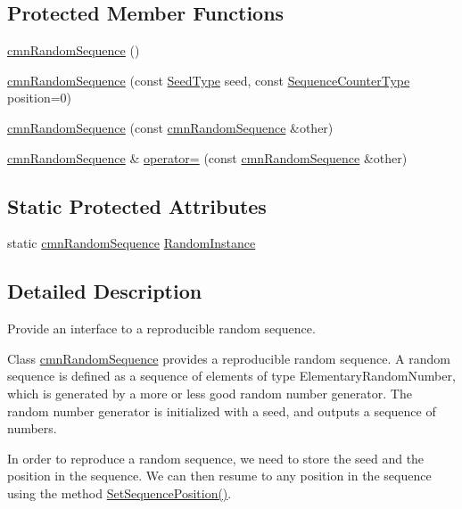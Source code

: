 \subsection*{Protected Member Functions}
\begin{DoxyCompactItemize}
\item 
\hyperlink{classcmn_random_sequence_ac2e1ccceb37bb3e42d1fc3148a564a30}{cmn\+Random\+Sequence} ()
\item 
\hyperlink{classcmn_random_sequence_a3d9618b02b6602c933d61cb824d2ec9b}{cmn\+Random\+Sequence} (const \hyperlink{classcmn_random_sequence_a7b97009536ce38559fa5fb86a9eea16d}{Seed\+Type} seed, const \hyperlink{classcmn_random_sequence_ac3befd667513146020ef266429e205b0}{Sequence\+Counter\+Type} position=0)
\item 
\hyperlink{classcmn_random_sequence_ab68b8fc9eab0f1930a65ee1e1bd9af74}{cmn\+Random\+Sequence} (const \hyperlink{classcmn_random_sequence}{cmn\+Random\+Sequence} \&other)
\item 
\hyperlink{classcmn_random_sequence}{cmn\+Random\+Sequence} \& \hyperlink{classcmn_random_sequence_a38c6f005dd81ae091b56d59541ed091f}{operator=} (const \hyperlink{classcmn_random_sequence}{cmn\+Random\+Sequence} \&other)
\end{DoxyCompactItemize}
\subsection*{Static Protected Attributes}
\begin{DoxyCompactItemize}
\item 
static \hyperlink{classcmn_random_sequence}{cmn\+Random\+Sequence} \hyperlink{classcmn_random_sequence_a04d180901d880761b49e6c61b79423f3}{Random\+Instance}
\end{DoxyCompactItemize}


\subsection{Detailed Description}
Provide an interface to a reproducible random sequence. 

Class \hyperlink{classcmn_random_sequence}{cmn\+Random\+Sequence} provides a reproducible random sequence. A random sequence is defined as a sequence of elements of type Elementary\+Random\+Number, which is generated by a more or less good random number generator. The random number generator is initialized with a seed, and outputs a sequence of numbers.

In order to reproduce a random sequence, we need to store the seed and the position in the sequence. We can then resume to any position in the sequence using the method \hyperlink{classcmn_random_sequence_aa3dacc3e54ded2e0b55e78e460f1bd0d}{Set\+Sequence\+Position()}.

